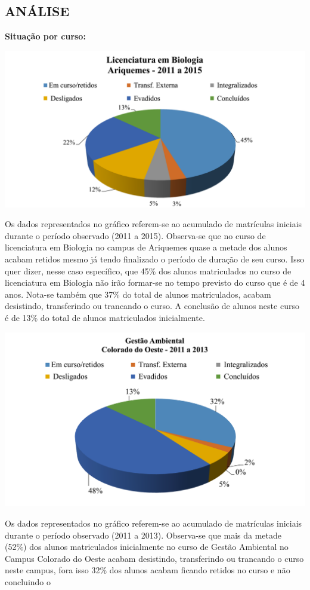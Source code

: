 \documentclass[article,12pt,onesidea,4paper,english,brazil]{abntex2}
\begin{document}
	\subsection*{ANÁLISE}
	\textbf{Situação por curso:}
	\begin{center}
		\includegraphics[width=0.7\linewidth]{pip-97-6}
	\end{center}
	Os dados representados no gráfico referem-se ao acumulado de matrículas iniciais durante o
	período observado (2011 a 2015).
	Observa-se que no curso de licenciatura em Biologia no campus de Ariquemes quase a
	metade dos alunos acabam retidos mesmo já tendo finalizado o período de duração de seu curso.
	Isso quer dizer, nesse caso específico, que 45\% dos alunos matriculados no curso de licenciatura
	em Biologia não irão formar-se no tempo previsto do curso que é de 4 anos. Nota-se também que 37\% do total de alunos matriculados, acabam desistindo, transferindo ou trancando o curso. A
	conclusão de alunos neste curso é de 13\% do total de alunos matriculados inicialmente.
	\begin{center}
		\includegraphics[width=0.7\linewidth]{pip-97-7}
	\end{center}
	Os dados representados no gráfico referem-se ao acumulado de matrículas iniciais durante o
	período observado (2011 a 2013).
	Observa-se que mais da metade (52\%) dos alunos matriculados inicialmente no curso de
	Gestão Ambiental no Campus Colorado do Oeste acabam desistindo, transferindo ou trancando o
	curso neste campus, fora isso 32\% dos alunos acabam ficando retidos no curso e não concluindo o
\end{document}
